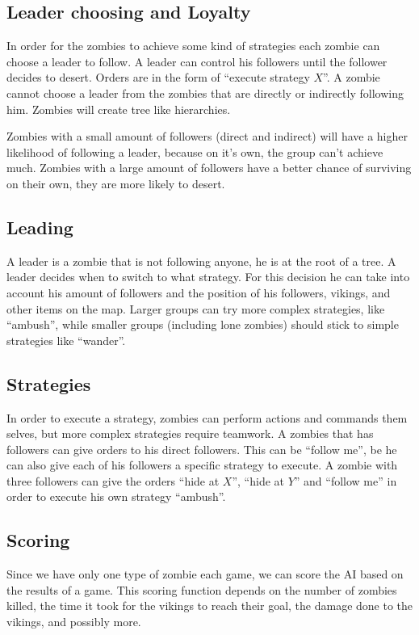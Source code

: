 \subsection{Leader choosing and Loyalty}
In order for the zombies to achieve some kind of strategies each zombie can choose a leader to follow. A leader can control his followers until the follower decides to desert. Orders are in the form of ``execute strategy $X$''. A zombie cannot choose a leader from the zombies that are directly or indirectly following him. Zombies will create tree like hierarchies.

Zombies with a small amount of followers (direct and indirect) will have a higher likelihood of following a leader, because on it's own, the group can't achieve much. Zombies with a large amount of followers have a better chance of surviving on their own, they are more likely to desert.

\subsection{Leading}
A leader is a zombie that is not following anyone, he is at the root of a tree. A leader decides when to switch to what strategy. For this decision he can take into account his amount of followers and the position of his followers, vikings, and other items on the map. Larger groups can try more complex strategies, like ``ambush'', while smaller groups (including lone zombies) should stick to simple strategies like ``wander''.

\subsection{Strategies}
In order to execute a strategy, zombies can perform actions and commands them selves, but more complex strategies require teamwork. A zombies that has followers can give orders to his direct followers. This can be ``follow me'', be he can also give each of his followers a specific strategy to execute. A zombie with three followers can give the orders ``hide at $X$'', ``hide at $Y$'' and ``follow me'' in order to execute his own strategy ``ambush''.

\subsection{Scoring}
Since we have only one type of zombie each game, we can score the AI based on the results of a game. This scoring function depends on the number of zombies killed, the time it took for the vikings to reach their goal, the damage done to the vikings, and possibly more.

